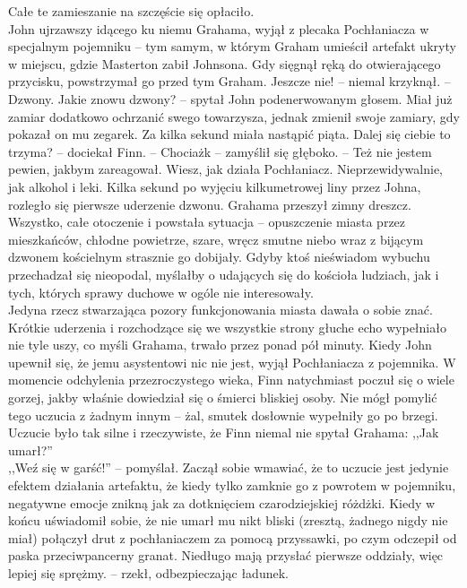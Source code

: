 \documentclass[../MAIN.tex]{subfiles}
\begin{document}
Całe te zamieszanie na szczęście się opłaciło.\\
John ujrzawszy idącego ku niemu Grahama, wyjął z plecaka Pochłaniacza w specjalnym pojemniku -- tym samym, w którym Graham umieścił artefakt ukryty w miejscu, gdzie Masterton zabił Johnsona. Gdy sięgnął ręką do otwierającego przycisku, powstrzymał go przed tym Graham.
\sx Jeszcze nie! -- niemal krzyknął. -- Dzwony.
\xx Jakie znowu dzwony? -- spytał John podenerwowanym głosem. 
\qd
Miał już zamiar dodatkowo ochrzanić swego towarzysza, jednak zmienił swoje zamiary, gdy pokazał on mu zegarek. Za kilka sekund miała nastąpić piąta.
\sx Dalej się ciebie to trzyma? -- dociekał Finn. -- Chociaż\3k -- zamyślił się głęboko. -- Też nie jestem pewien, jakbym zareagował. Wiesz, jak działa Pochłaniacz. Nieprzewidywalnie, jak alkohol i leki.
\qd
Kilka sekund po wyjęciu kilkumetrowej liny przez Johna, rozległo się pierwsze uderzenie dzwonu. Grahama przeszył zimny dreszcz. Wszystko, całe otoczenie i powstała sytuacja -- opuszczenie miasta przez mieszkańców, chłodne powietrze, szare, wręcz smutne niebo wraz z bijącym dzwonem kościelnym strasznie go dobijały. Gdyby ktoś nieświadom wybuchu przechadzał się nieopodal, myślałby o udających się do kościoła ludziach, jak i tych, których sprawy duchowe w ogóle nie interesowały.\\
Jedyna rzecz stwarzająca pozory funkcjonowania miasta dawała o sobie znać. Krótkie uderzenia i rozchodzące się we wszystkie strony głuche echo wypełniało nie tyle uszy, co myśli Grahama, trwało przez ponad pół minuty. Kiedy John upewnił się, że jemu asystentowi nic nie jest, wyjął Pochłaniacza z pojemnika. W momencie odchylenia przezroczystego wieka, Finn natychmiast poczuł się o wiele gorzej, jakby właśnie dowiedział się o śmierci bliskiej osoby. Nie mógł pomylić tego uczucia z żadnym innym -- żal, smutek dosłownie wypełniły go po brzegi. Uczucie było tak silne i rzeczywiste, że Finn niemal nie spytał Grahama: ,,Jak umarł?''\\
,,Weź się w garść!'' -- pomyślał. Zaczął sobie wmawiać, że to uczucie jest jedynie efektem działania artefaktu, że kiedy tylko zamknie go z powrotem w pojemniku, negatywne emocje znikną jak za dotknięciem czarodziejskiej różdżki. Kiedy w końcu uświadomił sobie, że nie umarł mu nikt bliski (zresztą, żadnego nigdy nie miał) połączył drut z pochłaniaczem za pomocą przyssawki, po czym odczepił od paska przeciwpancerny granat.
\sx Niedługo mają przysłać pierwsze oddziały, więc lepiej się sprężmy. -- rzekł, odbezpieczając ładunek.
\qd
\end{document}
